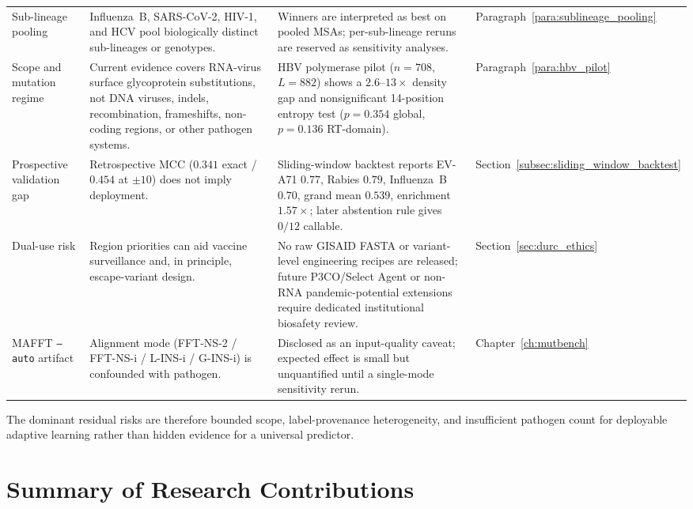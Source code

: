 {\begin{longtable}{p{}p{}p{}p{}}
Sub-lineage pooling & Influenza~B, SARS-CoV-2, HIV-1, and HCV pool biologically distinct sub-lineages or genotypes. & Winners are interpreted as best on pooled MSAs; per-sub-lineage reruns are reserved as sensitivity analyses. & Paragraph~\ref{para:sublineage_pooling} \\
Scope and mutation regime & Current evidence covers RNA-virus surface glycoprotein substitutions, not DNA viruses, indels, recombination, frameshifts, non-coding regions, or other pathogen systems. & HBV polymerase pilot ($n = 708$, $L = 882$) shows a $2.6$--$13\times$ density gap and nonsignificant 14-position entropy test ($p = 0.354$ global, $p = 0.136$ RT-domain). & Paragraph~\ref{para:hbv_pilot} \\
Prospective validation gap & Retrospective MCC ($0.341$ exact / $0.454$ at $\pm 10$) does not imply deployment. & Sliding-window backtest reports EV-A71 $0.77$, Rabies $0.79$, Influenza~B $0.70$, grand mean $0.539$, enrichment $1.57\times$; later abstention rule gives $0/12$ callable. & Section~\ref{subsec:sliding_window_backtest} \\
Dual-use risk & Region priorities can aid vaccine surveillance and, in principle, escape-variant design. & No raw GISAID FASTA or variant-level engineering recipes are released; future P3CO/Select Agent or non-RNA pandemic-potential extensions require dedicated institutional biosafety review. & Section~\ref{sec:durc_ethics} \\
MAFFT \texttt{--auto} artifact & Alignment mode (FFT-NS-2 / FFT-NS-i / L-INS-i / G-INS-i) is confounded with pathogen. & Disclosed as an input-quality caveat; expected effect is small but unquantified until a single-mode sensitivity rerun. & Chapter~\ref{ch:mutbench} \\
\bottomrule
\end{longtable}
}

The dominant residual risks are therefore bounded scope, label-provenance heterogeneity, and insufficient pathogen count for deployable adaptive learning rather than hidden evidence for a universal predictor.

\section{Summary of Research Contributions}
\label{sec:contribution_summary}
\label{ch:conclusion}

